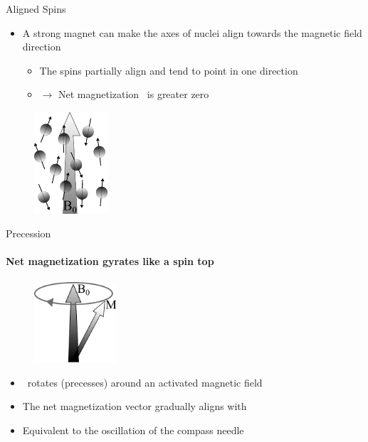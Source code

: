 \begin{frame}{Aligned Spins}

    \begin{itemize}
        \item A strong magnet can make the axes of nuclei align towards the magnetic field direction 
              \begin{itemize}
                  \item The spins partially align and tend to point in one direction
                  \item $\rightarrow$ Net magnetization \magn~is greater zero
              \end{itemize}
    \end{itemize}

    \begin{figure}
        \centering
        \includegraphics[height=3.8cm]{images/aligned_spins.pdf}
    \end{figure}
    
\end{frame}

\begin{frame}{Precession}
    \framesubtitle{Net magnetization gyrates like a spin top}

    \begin{figure}
        \centering
        \includegraphics[height=3cm]{images/precession.pdf}
    \end{figure}



    \begin{itemize}
        \item 	\magn~rotates (precesses) around an activated magnetic field 
        \item The net magnetization vector gradually aligns with 
        \item Equivalent to the oscillation of the compass needle
    \end{itemize}

\end{frame}

